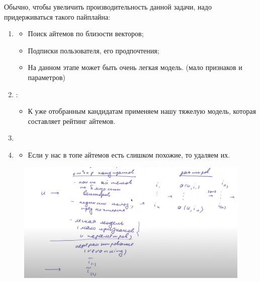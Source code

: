             Обычно, чтобы увеличить производительность данной задачи, надо придерживаться такого пайплайна:
            
            \begin{enumerate}
                \item {}
                    \begin{itemize}
                        \item Поиск айтемов по близости векторов; 

                        \item Подписки пользователя, его продпочтения;

                        \item На данном этапе может быть очень легкая модель. (мало признаков и параметров)
                    \end{itemize}

                \item {}:
                    \begin{itemize}
                        \item К уже отобранным кандидатам применяем нашу тяжелую модель, которая составляет рейтинг айтемов. 
                    \end{itemize}

                \item {}

                \item {}
                    \begin{itemize}
                        \item Если у нас в топе айтемов есть слишком похожие, то удаляем их. 
                    \end{itemize}
            \end{enumerate}

            \begin{figure}[H]
                \centering
                \includegraphics[width=1\textwidth]{images/14lecture/inproved_user-item_system.png}
            \end{figure} 


